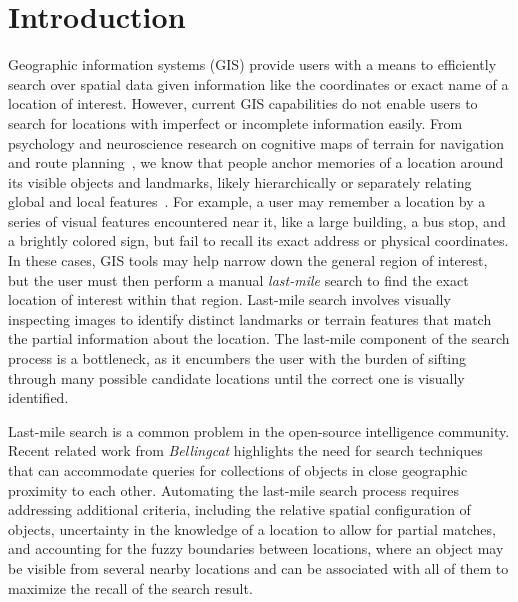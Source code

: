 \section{Introduction}
\label{section:introduction}
Geographic information systems (GIS) provide users with a means to efficiently search over spatial data given information like the coordinates or exact name of a location of interest. 
However, current GIS capabilities do not enable users to search for locations with imperfect or incomplete information easily. 
From psychology and neuroscience research on cognitive maps of terrain for navigation and route planning~\cite{Weisberg2016, Miller2013, Keatley2021}, we know that people anchor memories of a location around its visible objects and landmarks, likely hierarchically or separately relating global and local features~\cite{Weisberg2016}. 
For example, a user may remember a location by a series of visual features encountered near it, like a large building, a bus stop, and a brightly colored sign, but fail to recall its exact address or physical coordinates. 
In these cases, GIS tools may help narrow down the general region of interest, but the user must then perform a manual \emph{last-mile} search to find the exact location of interest within that region. 
Last-mile search involves visually inspecting images to identify distinct landmarks or terrain features that match the partial information about the location. 
The last-mile component of the search process is a bottleneck, as it encumbers the user with the burden of sifting through many possible candidate locations until the correct one is visually identified. 

Last-mile search is a common problem in the open-source intelligence community. %
Recent related work from \textit{Bellingcat}
highlights the need for search techniques that can accommodate queries for collections of objects in close geographic proximity to each other.
Automating the last-mile search process requires addressing additional criteria, including the relative spatial configuration of objects, uncertainty in the knowledge of a location to allow for partial matches, and accounting for the fuzzy boundaries between locations, where an object may be visible from several nearby locations and can be associated with all of them to maximize the recall of the search result.

